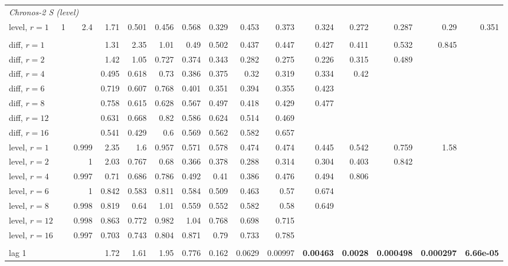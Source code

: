 \begin{table}[t]
\begin{tabular}{lrrrrrrrrrrrrrr}
\multicolumn{15}{l}{\textit{Chronos-2 S (level)}} \\
\quad level, $r{=}1$ & 1 & 2.4 & 1.71 & 0.501 & 0.456 & 0.568 & 0.329 & 0.453 & 0.373 & 0.324 & 0.272 & 0.287 & 0.29 & 0.351 \\
\addlinespace
\multicolumn{15}{l}{\textit{Moirai}} \\
\quad diff, $r{=}1$ &  &  & 1.31 & 2.35 & 1.01 & 0.49 & 0.502 & 0.437 & 0.447 & 0.427 & 0.411 & 0.532 & 0.845 &  \\
\quad diff, $r{=}2$ &  &  & 1.42 & 1.05 & 0.727 & 0.374 & 0.343 & 0.282 & 0.275 & 0.226 & 0.315 & 0.489 &  &  \\
\quad diff, $r{=}4$ &  &  & 0.495 & 0.618 & 0.73 & 0.386 & 0.375 & 0.32 & 0.319 & 0.334 & 0.42 &  &  &  \\
\quad diff, $r{=}6$ &  &  & 0.719 & 0.607 & 0.768 & 0.401 & 0.351 & 0.394 & 0.355 & 0.423 &  &  &  &  \\
\quad diff, $r{=}8$ &  &  & 0.758 & 0.615 & 0.628 & 0.567 & 0.497 & 0.418 & 0.429 & 0.477 &  &  &  &  \\
\quad diff, $r{=}12$ &  &  & 0.631 & 0.668 & 0.82 & 0.586 & 0.624 & 0.514 & 0.469 &  &  &  &  &  \\
\quad diff, $r{=}16$ &  &  & 0.541 & 0.429 & 0.6 & 0.569 & 0.562 & 0.582 & 0.657 &  &  &  &  &  \\
\quad level, $r{=}1$ &  & 0.999 & 2.35 & 1.6 & 0.957 & 0.571 & 0.578 & 0.474 & 0.474 & 0.445 & 0.542 & 0.759 & 1.58 &  \\
\quad level, $r{=}2$ &  & 1 & 2.03 & 0.767 & 0.68 & 0.366 & 0.378 & 0.288 & 0.314 & 0.304 & 0.403 & 0.842 &  &  \\
\quad level, $r{=}4$ &  & 0.997 & 0.71 & 0.686 & 0.786 & 0.492 & 0.41 & 0.386 & 0.476 & 0.494 & 0.806 &  &  &  \\
\quad level, $r{=}6$ &  & 1 & 0.842 & 0.583 & 0.811 & 0.584 & 0.509 & 0.463 & 0.57 & 0.674 &  &  &  &  \\
\quad level, $r{=}8$ &  & 0.998 & 0.819 & 0.64 & 1.01 & 0.559 & 0.552 & 0.582 & 0.58 & 0.649 &  &  &  &  \\
\quad level, $r{=}12$ &  & 0.998 & 0.863 & 0.772 & 0.982 & 1.04 & 0.768 & 0.698 & 0.715 &  &  &  &  &  \\
\quad level, $r{=}16$ &  & 0.997 & 0.703 & 0.743 & 0.804 & 0.871 & 0.79 & 0.733 & 0.785 &  &  &  &  &  \\
\addlinespace
\multicolumn{15}{l}{\textit{MLP}} \\
\quad lag 1 &  &  & 1.72 & 1.61 & 1.95 & 0.776 & 0.162 & 0.0629 & 0.00997 & \textbf{0.00463} & \textbf{0.0028} & \textbf{0.000498} & \textbf{0.000297} & \textbf{6.66e-05} \\

\end{tabular}
\end{table}
